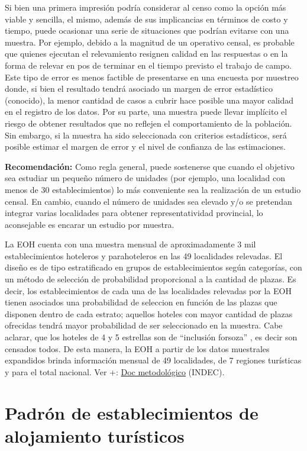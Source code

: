 \documentclass[
]{book}
\begin{document}
Si bien una primera impresión podría considerar al censo como la opción más viable y sencilla, el mismo, además de sus implicancias en términos de costo y tiempo, puede ocasionar una serie de situaciones que podrían evitarse con una muestra. Por ejemplo, debido a la magnitud de un operativo censal, es probable que quienes ejecutan el relevamiento resignen calidad en las respuestas o en la forma de relevar en pos de terminar en el tiempo previsto el trabajo de campo. Este tipo de error es menos factible de presentarse en una encuesta por muestreo donde, si bien el resultado tendrá asociado un margen de error estadístico (conocido), la menor cantidad de casos a cubrir hace posible una mayor calidad en el registro de los datos. Por su parte, una muestra puede llevar implícito el riesgo de obtener resultados que no reflejen el comportamiento de la población. Sin embargo, si la muestra ha sido seleccionada con criterios estadísticos, será posible estimar el margen de error y el nivel de confianza de las estimaciones.

\textbf{Recomendación:} Como regla general, puede sostenerse que cuando el objetivo sea estudiar un pequeño número de unidades (por ejemplo, una localidad con menos de 30 establecimientos) lo más conveniente sea la realización de un estudio censal. En cambio, cuando el número de unidades sea elevado y/o se pretendan integrar varias localidades para obtener representatividad provincial, lo aconsejable es encarar un estudio por muestra.

La EOH cuenta con una muestra mensual de aproximadamente 3 mil establecimientos hoteleros y parahoteleros en las 49 localidades relevadas. El diseño es de tipo estratificado en grupos de establecimientos según categorías, con un método de selección de probabilidad proporcional a la cantidad de plazas. Es decir, los establecimientos de cada una de las localidades relevadas por la EOH tienen asociados una probabilidad de seleccion en función de las plazas que disponen dentro de cada estrato; aquellos hoteles con mayor cantidad de plazas ofrecidas tendrá mayor probabilidad de ser seleccionado en la muestra. Cabe aclarar, que los hoteles de 4 y 5 estrellas son de ``inclusión forsoza'' , es decir son censados todos. De esta manera, la EOH a partir de los datos muestrales expandidos brinda información mensual de 49 localidades, de 7 regiones turísticas y para el total nacional. Ver +: \href{https://www.indec.gob.ar/ftp/cuadros/economia/eoh_aspectos_metodologicos.pdf}{Doc metodológico} (INDEC).

\hypertarget{padruxf3n-de-establecimientos-de-alojamiento-turuxedsticos}{%
\section{Padrón de establecimientos de alojamiento turísticos}\label{padruxf3n-de-establecimientos-de-alojamiento-turuxedsticos}}
\end{document}
